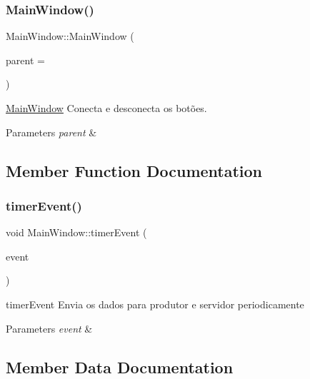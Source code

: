 \subsubsection{\texorpdfstring{Main\+Window()}{MainWindow()}}
{\footnotesize\ttfamily Main\+Window\+::\+Main\+Window (\begin{DoxyParamCaption}\item[{Q\+Widget $\ast$}]{parent = {} }\end{DoxyParamCaption})\hspace{0.3cm}{\ttfamily [explicit]}}



\mbox{\hyperlink{class_main_window}{Main\+Window}} Conecta e desconecta os botões. 


\begin{DoxyParams}{Parameters}
{\em parent} & \\
\hline
\end{DoxyParams}


\subsection{Member Function Documentation}
\mbox{\label{class_main_window_aaa425b1554af3c1f58cc70b4815082ae}} 
\subsubsection{\texorpdfstring{timer\+Event()}{timerEvent()}}
{\footnotesize\ttfamily void Main\+Window\+::timer\+Event (\begin{DoxyParamCaption}\item[{Q\+Timer\+Event $\ast$}]{event }\end{DoxyParamCaption})}



timer\+Event Envia os dados para produtor e servidor periodicamente 


\begin{DoxyParams}{Parameters}
{\em event} & \\
\hline
\end{DoxyParams}


\subsection{Member Data Documentation}
\mbox{\label{class_main_window_a6532047b0bff225c214b39c58f474c76}} 

